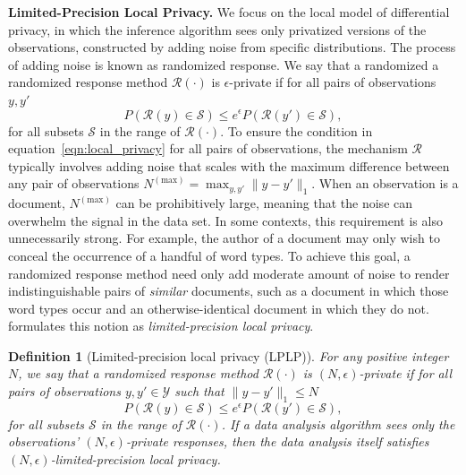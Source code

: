 \documentclass{article}
\newtheorem{definition}{Definition}
\newcommand{\tm}{\!-\!}
\begin{document}

\textbf{Limited-Precision Local Privacy.}  We focus on the local model
of differential privacy, in which the inference algorithm sees only
privatized versions of the observations, constructed by adding noise
from specific distributions. The process of adding noise is known as
randomized response. We say that a randomized
a randomized response method $\mathcal{R}(\cdot)$ is $\epsilon$-private if for all pairs of observations $y, y'$
\begin{equation}
  \label{eqn:local_privacy}
    P\left(\mathcal{R}(y) \in \mathcal{S}\right) \leq e^\epsilon
      P\left(\mathcal{R}(y') \in \mathcal{S}\right),
\end{equation}
for all subsets $\mathcal{S}$ in the range of $\mathcal{R}(\cdot)$. To
ensure the condition in equation~\ref{eqn:local_privacy} for all pairs
of observations, the mechanism $\mathcal{R}$ typically involves adding
noise that scales with the maximum difference between any pair of
observations $N^{(\textrm{max})} = \max_{y, y'}\|y \tm y'\|_1$. When
an observation is a document, $N^{(\textrm{max})}$ can be
prohibitively large, meaning that the noise can overwhelm the signal
in the data set. In some contexts, this requirement is also
unnecessarily strong. For example, the author of a document may only
wish to conceal the occurrence of a handful of word types. To achieve
this goal, a randomized response method need only add moderate amount
of noise to render indistinguishable pairs of \emph{similar}
documents, such as a document in which those word types occur and an
otherwise-identical document in which they do
not. \cite{schein2018locally} formulates this notion as
\emph{limited-precision local privacy}.


\begin{definition}[Limited-precision local privacy (LPLP)]
\label{def:lplp}
For any positive integer $N$, we say that a randomized response method
$\mathcal{R}(\cdot)$ is $(N, \epsilon)$-private if for all pairs of
observations $y, y' \in \mathcal{Y}$ such that $\|y - y'\|_1 \leq N$
\begin{equation}
  \label{eqn:lp_local_privacy}
    P\left(\mathcal{R}(y) \in \mathcal{S}\right) \leq e^\epsilon
      P\left(\mathcal{R}(y') \in \mathcal{S}\right),
        \end{equation}
for all subsets $\mathcal{S}$ in the range of $\mathcal{R}(\cdot)$.
If a data analysis algorithm sees only the observations' $(N,
\epsilon)$-private responses, then the data analysis itself satisfies
$(N, \epsilon)$-limited-precision local privacy. %
\end{definition}
\end{document}
